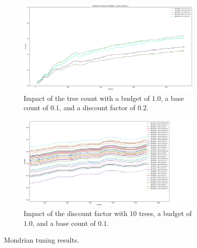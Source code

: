 \begin{figure}
\begin{subfigure}[b]{0.49\textwidth}
         \centering
         \includegraphics[width=\textwidth]{figures/Banos_S1_shuf_Mondrian_tree_count_fixed_other_bc0.1.png}
         \caption{Impact of the tree count with a budget of $1.0$, a base count of $0.1$, and a discount factor of $0.2$.}
     \end{subfigure}
     \begin{subfigure}[b]{0.49\textwidth}
         \centering
         \includegraphics[width=\textwidth]{figures/Banos_S1_disount_check.png}
         \caption{Impact of the discount factor with 10 trees, a budget of $1.0$, and a base count of $0.1$.}
     \end{subfigure}
        \caption{Mondrian tuning results.}
        \label{fig:mondrian-tuning}
\end{figure}

